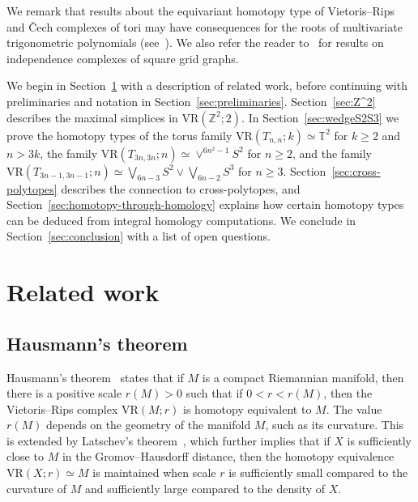 \documentclass[12pt,a4paper]{amsart}
\theoremstyle{definition}
\newcommand{\T}{\ensuremath{\mathbb{T}}}
\newcommand{\Z}{\ensuremath{\mathbb{Z}}}
\newcommand{\vr}[2]{\mathrm{VR}(#1;#2)}
\numberwithin{equation}{section}
\begin{document}
We remark that results about the equivariant homotopy type of Vietoris--Rips and \v{C}ech complexes of tori may have consequences for the roots of multivariate trigonometric polynomials (see~\cite{cantor2025roots}).
We also refer the reader to~\cite{fendley2004hard,jonsson2006hard,IndCplxSquareGrids} for results on independence complexes of square grid graphs.

We begin in Section~\ref{sec:related} with a description of related work, before continuing with preliminaries and notation in Section~\ref{sec:preliminaries}.
Section~\ref{sec:Z^2} describes the maximal simplices in $\vr{\Z^2}{2}$.
In Section~\ref{sec:wedgeS2S3} we prove the homotopy types of
the torus family $\vr{T_{n, n}}{k}\simeq\T^2$ for $k\ge 2$ and $n>3k$, the family $\vr{T_{3n,3n}}{n}\simeq\vee^{6n^2-1}S^2$ for $n\ge 2$, and the family $\vr{T_{3n-1,3n-1}}{n}\simeq \bigvee_{6n-3} S^2\vee \bigvee_{6n-2}S^3$ for $n\geq 3$.
Section~\ref{sec:cross-polytopes} describes the connection to cross-polytopes, and Section~\ref{sec:homotopy-through-homology} explains how certain homotopy types can be deduced from integral homology computations.
We conclude in Section~\ref{sec:conclusion} with a list of open questions.



\section{Related work}
\label{sec:related}

\subsection*{Hausmann's theorem}

Hausmann's theorem~\cite{Hausmann1995} states that if $M$ is a compact Riemannian manifold, then there is a positive scale $r(M) > 0$ such that if $0 < r < r(M)$, then the Vietoris--Rips complex $\vr{M}{r}$ is homotopy equivalent to $M$.
The value $r(M)$ depends on the geometry of the manifold $M$, such as its curvature.
This is extended by Latschev's theorem~\cite{Latschev2001}, which further implies that if $X$ is sufficiently close to $M$ in the Gromov--Hausdorff distance, then the homotopy equivalence $\vr{X}{r}\simeq M$ is maintained when scale $r$ is sufficiently small compared to the curvature of $M$ and sufficiently large compared to the density of $X$.
\end{document}
